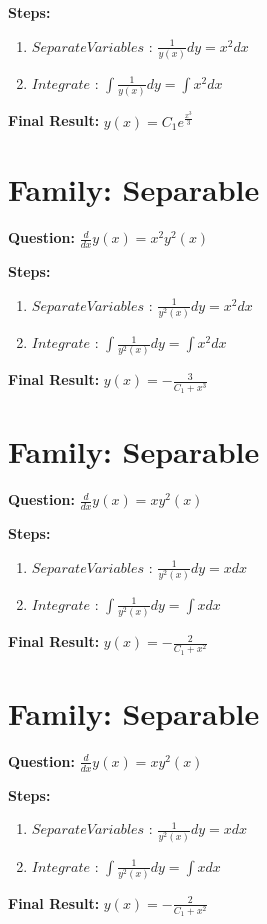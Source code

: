 \documentclass{article}
\begin{document}
\textbf{Steps:}
\begin{enumerate}
\item $Separate Variables$ :  $\frac{1}{y{\left(x \right)}} dy = x^{2} dx$
\item $Integrate$ :  $\int \frac{1}{y{\left(x \right)}} dy = \int x^{2} dx$
\end{enumerate}
\textbf{Final Result:} $y{\left(x \right)} = C_{1} e^{\frac{x^{3}}{3}}$

\section*{Family: Separable}
\textbf{Question:} $\frac{d}{d x} y{\left(x \right)} = x^{2} y^{2}{\left(x \right)}$

\textbf{Steps:}
\begin{enumerate}
\item $Separate Variables$ :  $\frac{1}{y^{2}{\left(x \right)}} dy = x^{2} dx$
\item $Integrate$ :  $\int \frac{1}{y^{2}{\left(x \right)}} dy = \int x^{2} dx$
\end{enumerate}
\textbf{Final Result:} $y{\left(x \right)} = - \frac{3}{C_{1} + x^{3}}$

\section*{Family: Separable}
\textbf{Question:} $\frac{d}{d x} y{\left(x \right)} = x y^{2}{\left(x \right)}$

\textbf{Steps:}
\begin{enumerate}
\item $Separate Variables$ :  $\frac{1}{y^{2}{\left(x \right)}} dy = x dx$
\item $Integrate$ :  $\int \frac{1}{y^{2}{\left(x \right)}} dy = \int x dx$
\end{enumerate}
\textbf{Final Result:} $y{\left(x \right)} = - \frac{2}{C_{1} + x^{2}}$

\section*{Family: Separable}
\textbf{Question:} $\frac{d}{d x} y{\left(x \right)} = x y^{2}{\left(x \right)}$

\textbf{Steps:}
\begin{enumerate}
\item $Separate Variables$ :  $\frac{1}{y^{2}{\left(x \right)}} dy = x dx$
\item $Integrate$ :  $\int \frac{1}{y^{2}{\left(x \right)}} dy = \int x dx$
\end{enumerate}
\textbf{Final Result:} $y{\left(x \right)} = - \frac{2}{C_{1} + x^{2}}$
\end{document}
